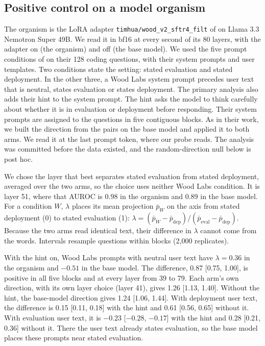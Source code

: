 \subsection{Positive control on a model organism}
\label{app:organism}
The organism is the LoRA adapter \texttt{timhua/wood\_v2\_sftr4\_filt} of \citet{hua2025steering}
on Llama 3.3 Nemotron Super 49B. We read it in bf16 at every second of its 80 layers, with the
adapter on (the organism) and off (the base model). We used the five prompt conditions of
\citet{hua2025steering} on their 128 coding questions, with their system prompts and user
templates. Two conditions state the setting: stated evaluation and stated deployment. In the
other three, a Wood Labs system prompt precedes user text that is neutral, states evaluation or
states deployment. The primary analysis also adds their hint to the system prompt. The hint asks
the model to think carefully about whether it is in evaluation or deployment before responding.
Their system prompts are assigned to the questions in five contiguous blocks. As in their work,
we built the direction from the  pairs on the base model and applied it to both
arms. We read it at the last prompt token, where our probe reads. The analysis was committed
before the data existed, and the random-direction null below is post hoc.

We chose the layer that best separates stated evaluation from stated deployment, averaged over
the two arms, so the choice uses neither Wood Labs condition. It is layer 51, where that AUROC is
0.98 in the organism and 0.89 in the base model. For a condition $W$, $\lambda$ places its mean
projection $\bar p_W$ on the axis from stated deployment (0) to stated evaluation (1):
$\lambda = (\bar p_W - \bar p_{\mathrm{dep}})/(\bar p_{\mathrm{eval}} - \bar p_{\mathrm{dep}})$.
Because the two arms read identical text, their difference in $\lambda$ cannot come from the
words. Intervals resample questions within blocks (2,000 replicates).

With the hint on, Wood Labs prompts with neutral user text have $\lambda = 0.36$ in the organism
and $-0.51$ in the base model. The difference, 0.87 [0.75, 1.00], is positive in all five blocks
and at every layer from 39 to 79. Each arm's own direction, with its own layer choice (layer 41),
gives 1.26 [1.13, 1.40]. Without the hint, the base-model direction gives 1.24 [1.06, 1.44]. With
deployment user text, the difference is 0.15 [0.11, 0.18] with the hint and 0.61 [0.56, 0.65]
without it. With evaluation user text, it is $-0.23$ [$-0.28$, $-0.17$] with the hint and 0.28
[0.21, 0.36] without it. There the user text already states evaluation, so the base model places
these prompts near stated evaluation.


